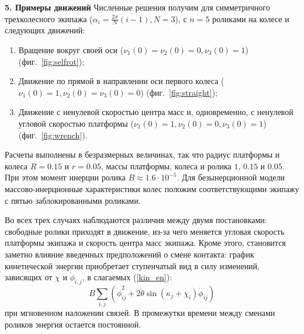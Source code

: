 
{\bf 5. Примеры движений}
Численные решения получим для симметричного трехколесного экипажа ($\alpha_i = \frac{2\pi}{N}(i - 1), N = 3$), с $n = 5$ роликами на колесе и следующих движений:
\begin{enumerate}[wide]
  \item \label{sol:selfrot} Вращение вокруг своей оси ($\nu_1(0) = \nu_2(0) = 0, \nu_3(0) = 1$) (фиг.~\ref{fig:selfrot});
  \item \label{sol:straight} Движение по прямой в направлении оси первого колеса ($\nu_1(0) = 1, \nu_2(0) = \nu_3(0) = 0$) (фиг.~\ref{fig:straight});
  \item \label{sol:wrench} Движение с ненулевой скоростью центра масс и, одновременно, с ненулевой угловой скоростью платформы ($\nu_1(0) = 1, \nu_2(0) = 0, \nu_3(0) = 1$) (фиг.~\ref{fig:wrench}).

\end{enumerate}


Расчеты выполнены в безразмерных величинах, так что радиус платформы и колеса $R = 0.15$ и $r = 0.05$, массы платформы, колеса и ролика $1$, $0.15$ и $0.05$. При этом момент инерции ролика $B \approx 1.6 \cdot 10^{-5}$. Для безынерционной модели массово-инерционные характеристики колес положим соответствующими экипажу с пятью заблокированными роликами.

Во всех трех случаях наблюдаются различия между двумя постановками: свободные ролики приходят в движение, из-за чего меняется угловая скорость платформы экипажа и скорость центра масс экипажа. Кроме этого, становится заметно влияние введенных предположений о смене контакта: график кинетической энергии приобретает ступенчатый вид в силу изменений, зависящих от $\chi$ и $\dot{\phi}_{i,j}$, в слагаемых (\ref{kin_en}): 
\begin{equation}\label{sines_in_kin_en}
    B\sum_{i,j}(\dot{\phi}_{ij}^2 + 2\dot{\theta}\sin(\kappa_j + \chi_i)\dot{\phi}_{ij})
\end{equation}
при мгновенном наложении связей. В промежутки времени между сменами роликов энергия остается постоянной. 

